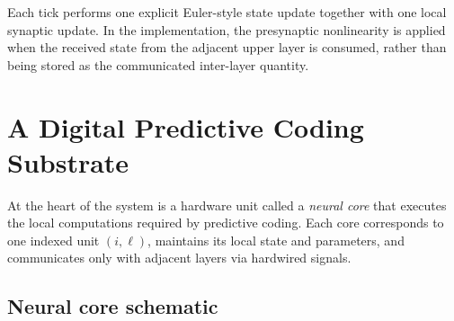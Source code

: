 \documentclass{article}
\begin{document}
Each tick performs one explicit Euler-style state update together with one local synaptic update. In the implementation, the presynaptic nonlinearity is applied when the received state from the adjacent upper layer is consumed, rather than being stored as the communicated inter-layer quantity.

\section{A Digital Predictive Coding Substrate}
\label{sec:arch}

At the heart of the system is a hardware unit called a \textit{neural core} that executes the local computations required by predictive coding. Each core corresponds to one indexed unit \((i,\ell)\), maintains its local state and parameters, and communicates only with adjacent layers via hardwired signals.

\subsection{Neural core schematic}
\label{sec:core-fig}
\end{document}

